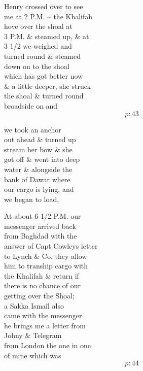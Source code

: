 \documentclass{report}
\begin{document}
	\par{
 	Henry crossed over to see\ \\me at 2 P.M. \~{} the Khalifah\ \\hove over the shoal at\ \\3 P.M. \& steamed up, \& at\ \\3 1/2 we weighed and\ \\turned round \& steamed\ \\down on to the shoal\ \\which has got better now\ \\\& a little deeper, she struck\ \\the shoal \& turned round\ \\broadside on and\ \\
  \[p: 43 \]

	}


	\par{
 	we took an anchor\ \\out ahead \& turned up\ \\stream her bow \& she\ \\got off \& went into deep\ \\water \& alongside the\ \\bank of Dawar where\ \\our cargo is lying, and\ \\we began to load,\ \\
	}

	\par{
 	At about 6 1/2 P.M. our\ \\messenger arrived back\ \\from Baghdad with the\ \\answer of Capt Cowleys letter\ \\to Lynch \& Co. they allow\ \\him to tranship cargo with\ \\the Khalifah \& return if\ \\there is no chance of our\ \\getting over the Shoal;\ \\a Sakka Ismaîl also\ \\came with the messenger\ \\he brings me a letter from\ \\Johny \& Telegram\ \\from London the one in one\ \\of mine which was\ \\
  \[p: 44 \]

	}
\end{document}
